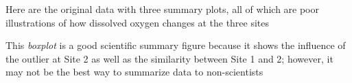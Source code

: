 \documentclass[10pt]{beamer}
\begin{document}
\begin{frame}
\begin{center}
\end{center}

\vspace{-2ex}
{\scriptsize Here are the original data with three {\color{magenta}
 summary} plots, all of which are poor illustrations of how dissolved oxygen
 changes at the three sites\\}  
\end{frame}

\begin{frame}
\begin{center}
\end{center}

\vspace{-2ex}
{\scriptsize This {\color{magenta} \em boxplot} is a good scientific summary
 figure because it shows the influence of the outlier at Site 2 as well as the
 similarity between Site 1 and 2; however, it may not be the best way to
 summarize data to non-scientists\\}  
\end{frame}
\end{document}
